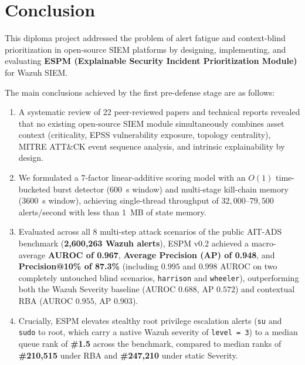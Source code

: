 \chapter{Conclusion}

This diploma project addressed the problem of alert fatigue and context-blind prioritization in open-source SIEM platforms by designing, implementing, and evaluating \textbf{ESPM (Explainable Security Incident Prioritization Module)} for Wazuh SIEM.

The main conclusions achieved by the first pre-defense stage are as follows:
\begin{enumerate}
    \item A systematic review of 22 peer-reviewed papers and technical reports revealed that no existing open-source SIEM module simultaneously combines asset context (criticality, EPSS vulnerability exposure, topology centrality), MITRE ATT\&CK event sequence analysis, and intrinsic explainability by design.
    \item We formulated a 7-factor linear-additive scoring model with an $O(1)$ time-bucketed burst detector (600~s window) and multi-stage kill-chain memory (3600~s window), achieving single-thread throughput of $32,000\text{--}79,500$ alerts/second with less than 1~MB of state memory.
    \item Evaluated across all 8 multi-step attack scenarios of the public AIT-ADS benchmark (\textbf{2,600,263 Wazuh alerts}), ESPM v0.2 achieved a macro-average \textbf{AUROC of 0.967}, \textbf{Average Precision (AP) of 0.948}, and \textbf{Precision@10\% of 87.3\%} (including $0.995$ and $0.998$ AUROC on two completely untouched blind scenarios, \texttt{harrison} and \texttt{wheeler}), outperforming both the Wazuh Severity baseline (AUROC $0.688$, AP $0.572$) and contextual RBA (AUROC $0.955$, AP $0.903$).
    \item Crucially, ESPM elevates stealthy root privilege escalation alerts (\texttt{su} and \texttt{sudo} to root, which carry a native Wazuh severity of \texttt{level = 3}) to a median queue rank of \textbf{\#1.5} across the benchmark, compared to median ranks of \textbf{\#210,515} under RBA and \textbf{\#247,210} under static Severity.
\end{enumerate}
